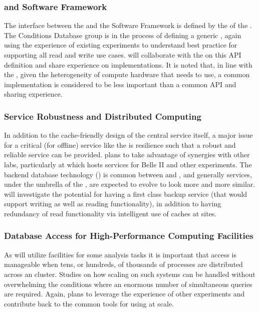 \documentclass[../main-v1.tex]{subfiles}
\begin{document}
\subsubsection{ and Software Framework}

The interface between the  and the Software Framework is defined by the  %
of the .  The  Conditions Database group is in the process of defining a generic , again using the experience of existing  experiments to understand best practice for supporting all read and write use cases.   will collaborate with the  on this API definition and share experience on implementations.  It is noted that, in line with the , given the heterogeneity of compute hardware that  needs to use, a common implementation is considered to be less important than a common API and sharing experience.

\subsubsection{ Service Robustness and Distributed Computing}

In addition to the cache-friendly design of the central  service itself, a major issue for a critical (for offline) service like the  is resilience such that a robust and reliable service can be provided.   plans to take advantage of synergies with other  labs, particularly at  which hosts  services for Belle II and other experiments.  The backend database technology () is common between  and , and generally  services, under the umbrella of the , are expected to evolve to look more and more similar.   will investigate the potential for having a first class backup service (that would support writing as well as reading functionality), in addition to having redundancy of read functionality via intelligent use of caches at sites.


\subsubsection{Database Access for High-Performance Computing Facilities}

As  will utilize  facilities for some analysis tasks it is important that  access is manageable when tens, or hundreds, of thousands of processes are distributed across an  cluster. Studies on how scaling on such systems can be handled without overwhelming the conditions  where an enormous number of simultaneous queries are required. Again,  plans to leverage the experience of other  experiments and contribute back to the common tools for using  at scale.
\end{document}
